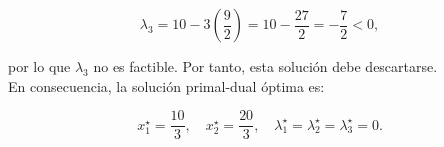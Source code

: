 \begin{enumerate}
\begin{equation}
\lambda_3=
10-3\left(\frac{9}{2}\right)=
10-\frac{27}{2}=-\frac{7}{2}<0,
\end{equation}

por lo que $\lambda_3$ no es factible. Por tanto, esta solución debe descartarse.\\

En consecuencia, la solución primal-dual óptima es:

\begin{equation}
\boxed{
x_1^\star=\frac{10}{3},
\quad
x_2^\star=\frac{20}{3}, \quad
\lambda_1^\star
=
\lambda_2^\star
=
\lambda_3^\star
=
0.
}
\end{equation}
\end{enumerate}
